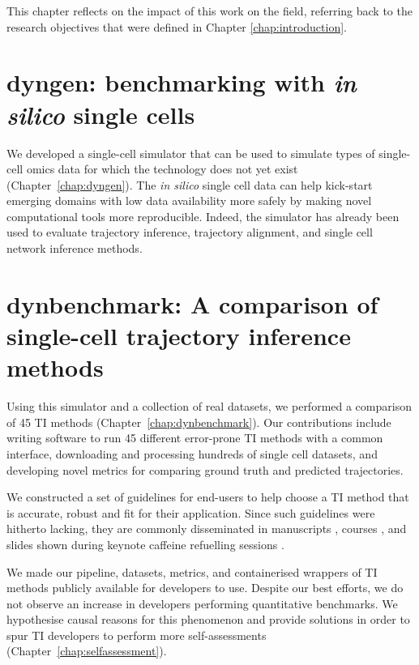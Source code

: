 	
This chapter reflects on the impact of this work on the field, referring back to the research objectives that were defined in Chapter \ref{chap:introduction}. 

\section{dyngen: benchmarking with \textit{in silico} single cells}
We developed a single-cell simulator that can be used to simulate types of single-cell omics data for which the technology does not yet exist (Chapter~\ref{chap:dyngen}). The \textit{in silico} single cell data can help kick-start emerging domains with low data availability more safely by making novel computational tools more reproducible. Indeed, the simulator has already been used to evaluate trajectory inference\cite{saelens_comparisonsinglecelltrajectory_2019}, trajectory alignment\cite{vandenberge_trajectorybaseddifferentialexpression_2019}, and single cell network inference\cite{pratapa_benchmarkingalgorithmsgene_2019} methods.

\section{dynbenchmark: A comparison of single-cell trajectory inference methods}
Using this simulator and a collection of real datasets, we performed a comparison of 45 TI methods (Chapter~\ref{chap:dynbenchmark}). 
Our contributions include writing software to run 45 different error-prone TI methods with a common interface, downloading and processing hundreds of single cell datasets, and developing novel metrics for comparing ground truth and predicted trajectories.

We constructed a set of guidelines for end-users to help choose a TI method that is accurate, robust and fit for their application. 
Since such guidelines were hitherto lacking, they are commonly disseminated in manuscripts \cite{lafzi_tutorialguidelinesexperimental_2018,luecken_currentbestpractices_2019}, courses \cite{kiselev_analysissinglecell_2019,martens_analysissinglecell_2019}, and slides shown during keynote caffeine refuelling sessions \cite{hemberg_coffeebreakanalysis_2019}. 

We made our pipeline, datasets, metrics, and containerised wrappers of TI methods publicly available for developers to use. Despite our best efforts, we do not observe an increase in developers performing quantitative benchmarks. We hypothesise causal reasons for this phenomenon and provide solutions in order to spur TI developers to perform more self-assessments (Chapter~\ref{chap:selfassessment}).

